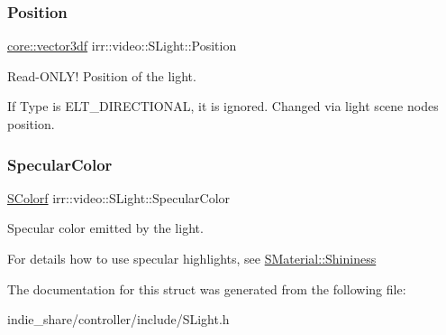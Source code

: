 \subsubsection{\texorpdfstring{Position}{Position}}
{\footnotesize\ttfamily \hyperlink{namespaceirr_1_1core_ae6e2b2a6c552833ebbd5b7463d03586b}{core\+::vector3df} irr\+::video\+::\+S\+Light\+::\+Position}



Read-\/\+O\+N\+L\+Y! Position of the light. 

If Type is E\+L\+T\+\_\+\+D\+I\+R\+E\+C\+T\+I\+O\+N\+AL, it is ignored. Changed via light scene node\textquotesingle{}s position. \mbox{\label{structirr_1_1video_1_1SLight_a2d66ad28850a8588b2ba727103710604}} 
\subsubsection{\texorpdfstring{Specular\+Color}{SpecularColor}}
{\footnotesize\ttfamily \hyperlink{classirr_1_1video_1_1SColorf}{S\+Colorf} irr\+::video\+::\+S\+Light\+::\+Specular\+Color}



Specular color emitted by the light. 

For details how to use specular highlights, see \hyperlink{classirr_1_1video_1_1SMaterial_a877106a83108db6d1f30a38379d28494}{S\+Material\+::\+Shininess} 

The documentation for this struct was generated from the following file\+:\begin{DoxyCompactItemize}
\item 
indie\+\_\+share/controller/include/S\+Light.\+h\end{DoxyCompactItemize}
